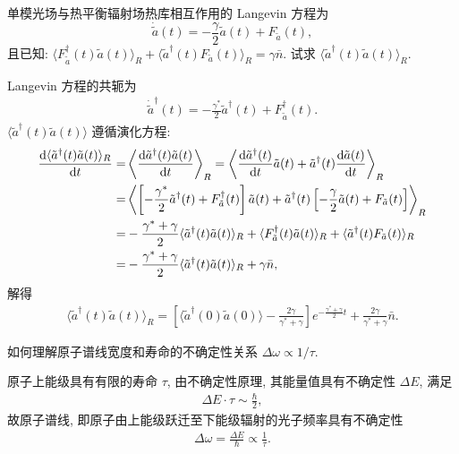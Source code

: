 \documentclass{assignment}
\begin{document}
\begin{prob}
    单模光场与热平衡辐射场热库相互作用的 Langevin 方程为
    \[
        \dot{\tilde{a}}(t)=-\frac{\gamma}{2}\tilde{a}(t)+F_{\tilde{a}}(t),
    \]
    且已知: $\langle F_{\tilde{a}}^{\dagger}(t)\tilde{a}(t)\rangle_R+\langle\tilde{a}^{\dagger}(t)F_{\tilde{a}}(t)\rangle_R=\gamma\bar{n}$. 试求 $\langle\tilde{a}^{\dagger}(t)\tilde{a}(t)\rangle_R$.
\end{prob}
\begin{sol}
    Langevin 方程的共轭为
    \begin{align}
        \dot{\tilde{a}}^{\dagger}(t)=-\frac{\gamma^*}{2}\tilde{a}^{\dagger}(t)+F_{\tilde{a}}^{\dagger}(t).
    \end{align}
    $\langle\tilde{a}^{\dagger}(t)\tilde{a}(t)\rangle$ 遵循演化方程:
    \begin{align}
        \notag\frac{\mathrm{d}\langle\tilde{a}^{\dagger}(t)\tilde{a}(t)\rangle_R}{\mathrm{d}t}=&\left\langle\frac{\mathrm{d}\tilde{a}^{\dagger}(t)\tilde{a}(t)}{\mathrm{d}t}\right\rangle_R=\left\langle\frac{\mathrm{d}\tilde{a}^{\dagger}(t)}{\mathrm{d}t}\tilde{a}(t)+\tilde{a}^{\dagger}(t)\frac{\mathrm{d}\tilde{a}(t)}{\mathrm{d}t}\right\rangle_R\\
        \notag=&\left\langle\left[-\frac{\gamma^*}{2}\tilde{a}^{\dagger}(t)+F_{\tilde{a}}^{\dagger}(t)\right]\tilde{a}(t)+\tilde{a}^{\dagger}(t)\left[-\frac{\gamma}{2}\tilde{a}(t)+F_{\tilde{a}}(t)\right]\right\rangle_R\\
        \notag=&-\frac{\gamma^*+\gamma}{2}\langle\tilde{a}^{\dagger}(t)\tilde{a}(t)\rangle_R+\langle F_{\tilde{a}}^{\dagger}(t)\tilde{a}(t)\rangle_R+\langle\tilde{a}^{\dagger}(t)F_{\tilde{a}}(t)\rangle_R\\
        =&-\frac{\gamma^*+\gamma}{2}\langle\tilde{a}^{\dagger}(t)\tilde{a}(t)\rangle_R+\gamma\bar{n},
    \end{align}
    解得
    \begin{align}
        \langle\tilde{a}^{\dagger}(t)\tilde{a}(t)\rangle_R=\left[\langle\tilde{a}^{\dagger}(0)\tilde{a}(0)\rangle-\frac{2\gamma}{\gamma^*+\gamma}\right]e^{-\frac{\gamma^*+\gamma}{2}t}+\frac{2\gamma}{\gamma^*+\gamma}\bar{n}.
    \end{align}
\end{sol}

\begin{prob}[附加题]
    如何理解原子谱线宽度和寿命的不确定性关系 $\Delta\omega\propto 1/\tau$.
\end{prob}
\begin{sol}
    原子上能级具有有限的寿命 $\tau$, 由不确定性原理, 其能量值具有不确定性 $\Delta E$, 满足
    \begin{align}
        \Delta E\cdot\tau\sim\frac{\hbar}{2},
    \end{align}
    故原子谱线, 即原子由上能级跃迁至下能级辐射的光子频率具有不确定性
    \begin{align}
        \Delta\omega=\frac{\Delta E}{\hbar}\propto\frac{1}{\tau}.
    \end{align}
\end{sol}
\end{document}

